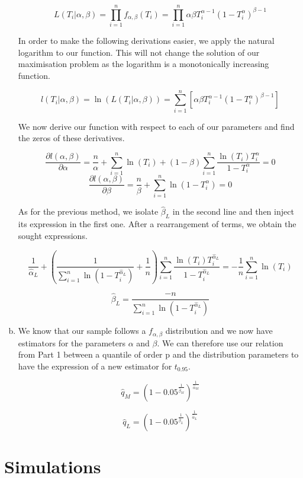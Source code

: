 \documentclass[a4paper]{article}
\begin{document}
\begin{enumerate}[(a)]
$$L(T_i|\alpha,\beta) = \prod_{i=1}^{n} f_{\alpha,\beta}(T_i) = \prod_{i=1}^{n} \alpha\beta T_i^{\alpha-1}(1-T_i^\alpha)^{\beta-1}$$

In order to make the following derivations easier, we apply the natural logarithm to our function. This will not change the solution of our maximisation problem as the logarithm is a monotonically increasing function.

$$l(T_i|\alpha,\beta) = \ln(L(T_i|\alpha,\beta)) = \sum_{i=1}^n \left [ \alpha\beta T_i^{\alpha-1}(1-T_i^\alpha)^{\beta-1} \right ]$$

We now derive our function with respect to each of our parameters and find the zeros of these derivatives.

$$ \frac{\partial l(\alpha, \beta)}{\partial \alpha} = \frac{n}{\alpha} + \sum_{i=1}^n \ln(T_i) + (1-\beta) \sum_{i=1}^{n} \frac{\ln(T_i) T_i^\alpha}{1-T_i^\alpha} = 0$$
$$ \frac{\partial l(\alpha, \beta)}{\partial \beta} = \frac{n}{\beta} + \sum_{i=1}^{n} \ln(1- T_i^\alpha)=0$$

As for the previous method, we isolate $\hat{\beta}_L$ in the second line and then inject its expression in the first one. After a rearrangement of terms, we obtain the sought expressions.

$$\frac{1}{\hat{\alpha}_L} + \left ( \frac{1}{\sum_{i=1}^n \ln(1-T_i^{\hat{\alpha}_L})} + \frac{1}{n}\right ) \sum_{i=1}^{n}\frac{\ln(T_i)T_i^{\hat{\alpha}_L}}{1-T_i^{\hat{\alpha}_L}} = - \frac{1}{n} \sum_{i=1}^n \ln(T_i)$$

$$\hat{\beta}_L = \frac{-n}{\sum_{i=1}^n \ln(1-T_i^{\hat{\alpha}_L})}$$

\item We know that our sample follows a $f_{\alpha,\beta}$ distribution and we now have estimators for the parameters $\alpha$ and $\beta$. We can therefore use our relation from Part 1 between a quantile of order p and the distribution parameters to have the expression of a new estimator for $t_{0.95}$.

$$ \hat{q}_M = (1-0.05^{\frac{1}{\hat{\beta}_M}})^{\frac{1}{\hat{\alpha}_M}}$$

$$ \hat{q}_L = (1-0.05^{\frac{1}{\hat{\beta}_L}})^{\frac{1}{\hat{\alpha}_L}}$$

\end{enumerate}


\section{Simulations}
\end{document}
